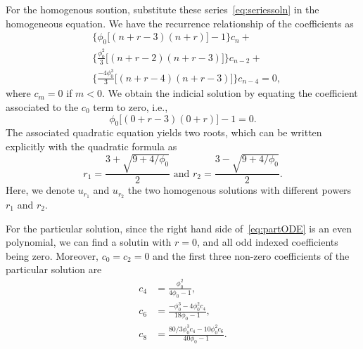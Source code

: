 For the homogenous soution, substitute these series~\eqref{eq:seriessoln} in the homogeneous equation. We have the 
recurrence relationship of the coefficients as
\begin{equation}\label{eq:recursive}
\begin{aligned}
&\bigg\{ \phi_0 \Big[(n+r-3)(n+r) \Big] - 1 \bigg\} c_n + \\ 
&\bigg\{ \frac{\phi_0^2}{3} \Big[(n+r-2)(n+r-3) \Big] \bigg\} c_{n-2} +\\
&\bigg\{ \frac{-4\phi_0^3}{3} \Big[ (n+r-4)(n+r-3) \Big] \bigg\} c_{n-4}  = 0,
\end{aligned}
\end{equation}
where $c_m=0$ if $m<0$.
We obtain the indicial solution by equating the coefficient associated to 
the $c_0$ term to zero, i.e.,
\begin{equation}
\phi_0\big[(0+r-3)(0+r) \big] - 1 = 0.
\end{equation}
The associated quadratic equation yields two roots, which can be written explicitly with 
the quadratic formula as
\begin{equation}
		  r_1 = \frac{3+\sqrt{9+4/\phi_0}}{2}\, \, \text{and} \,\,
r_2 = \frac{3-\sqrt{9+4/\phi_0}}{2}.
\end{equation}
Here, we denote $u_{r_1}$ and $u_{r_2}$ the two homogenous solutions with 
different powers $r_1$ and $r_2$.

For the particular solution, since the right hand side of~\eqref{eq:partODE}
is an even polynomial, we can find a solutin with $r=0$, and all odd indexed 
coefficients being zero. Moreover, $c_0 = c_2 = 0$ and 
the first three non-zero coefficients of the particular solution are
\begin{equation}
		  \begin{aligned}
c_4 & = \frac{\phi_0^2}{4\phi_0 - 1}, \\
c_6 & = \frac{-\phi_0^3 - 4\phi_0^2 c_4}{18\phi_0 - 1}, \\
c_8 & = \frac{80/3 \phi_0^3 c_4  - 10 \phi_0^2 c_6}{40\phi_0 -1}.
		  \end{aligned}
\end{equation}


